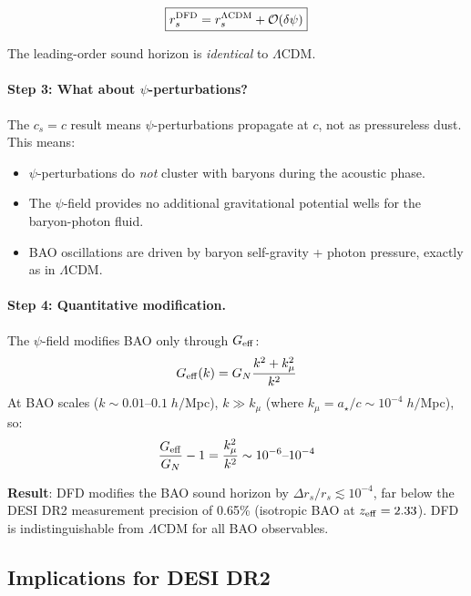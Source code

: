 \documentclass[11pt]{article}
\begin{document}
\begin{equation}
\boxed{r_s^{\rm DFD} = r_s^{\Lambda\text{CDM}} + \mathcal{O}(\delta\psi)}
\end{equation}

The leading-order sound horizon is \emph{identical} to $\Lambda$CDM.

\paragraph{Step 3: What about $\psi$-perturbations?}
The $c_s = c$ result means $\psi$-perturbations propagate at $c$, not
as pressureless dust. This means:
\begin{itemize}
\item $\psi$-perturbations do \emph{not} cluster with baryons during
  the acoustic phase.
\item The $\psi$-field provides no additional gravitational potential
  wells for the baryon-photon fluid.
\item BAO oscillations are driven by baryon self-gravity + photon
  pressure, exactly as in $\Lambda$CDM.
\end{itemize}

\paragraph{Step 4: Quantitative modification.}
The $\psi$-field modifies BAO only through $G_{\rm eff}$:
\begin{equation}
G_{\rm eff}(k) = G_N \frac{k^2 + k_\mu^2}{k^2}
\end{equation}
At BAO scales ($k \sim 0.01$--$0.1\;h/$Mpc), $k \gg k_\mu$
(where $k_\mu = a_\star/c \sim 10^{-4}\;h/$Mpc), so:
\begin{equation}
\frac{G_{\rm eff}}{G_N} - 1 = \frac{k_\mu^2}{k^2}
\sim 10^{-6}\text{--}10^{-4}
\end{equation}

\begin{tcolorbox}[colback=green!5!white, colframe=green!70!black]
\textbf{Result}: DFD modifies the BAO sound horizon by
$\Delta r_s / r_s \lesssim 10^{-4}$, far below the DESI DR2 measurement
precision of 0.65\% (isotropic BAO at $z_{\rm eff} = 2.33$).
DFD is indistinguishable from $\Lambda$CDM for all BAO observables.
\end{tcolorbox}

\subsection{Implications for DESI DR2}
\end{document}

